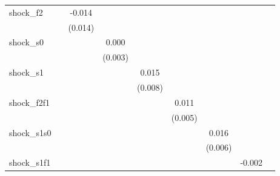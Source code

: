 {\begin{tabular}{l*{8}{c}}
\addlinespace
shock\_f2    &                     &      -0.014         &                     &                     &                     &                     &                     &                     \\
            &                     &     (0.014)         &                     &                     &                     &                     &                     &                     \\
\addlinespace
shock\_s0    &                     &                     &       0.000         &                     &                     &                     &                     &                     \\
            &                     &                     &     (0.003)         &                     &                     &                     &                     &                     \\
\addlinespace
shock\_s1    &                     &                     &                     &       0.015\sym{*}  &                     &                     &                     &                     \\
            &                     &                     &                     &     (0.008)         &                     &                     &                     &                     \\
\addlinespace
shock\_f2f1  &                     &                     &                     &                     &       0.011\sym{*}  &                     &                     &                     \\
            &                     &                     &                     &                     &     (0.005)         &                     &                     &                     \\
\addlinespace
shock\_s1s0  &                     &                     &                     &                     &                     &       0.016\sym{**} &                     &                     \\
            &                     &                     &                     &                     &                     &     (0.006)         &                     &                     \\
\addlinespace
shock\_s1f1  &                     &                     &                     &                     &                     &                     &      -0.002         &                     \\

\end{tabular}}
